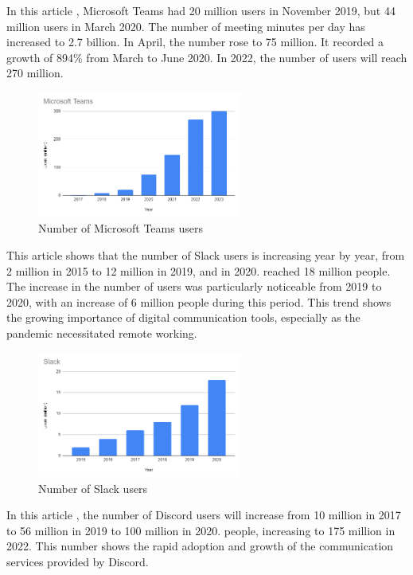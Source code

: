 \documentclass[12pt]{article}
\begin{document}
In this article \cite{teams_status},
Microsoft
Teams had 20 million users in November 2019, but 44 million users in March
2020. The number of meeting minutes per day has increased to 2.7 billion. In
April, the number rose to 75 million. It recorded a growth of
894\% from March to June 2020. In 2022, the number of users will reach 270
million.

\begin{figure}[H]
    \centering
    \includegraphics[width=0.6\textwidth]{teams.png}
    \caption{Number of Microsoft Teams users}
    \label{fig:my_label}
\end{figure}

This article \cite{slack_status} shows that
the number of Slack users is increasing year by year, from 2 million in 2015 to
12 million in 2019, and in 2020. reached 18 million people. The increase in the
number of users was particularly noticeable from 2019 to 2020, with an increase
of 6 million people during this period. This trend shows the growing importance
of digital communication tools, especially as the pandemic necessitated remote
working.

\begin{figure}[H]
    \centering
    \includegraphics[width=0.6\textwidth]{slack.png}
    \caption{Number of Slack users}
    \label{fig:my_label}
\end{figure}

In this article \cite{discord_status}, the
number of Discord users will increase from 10 million in 2017 to 56 million in
2019 to 100 million in 2020. people, increasing to 175 million in 2022. This
number shows the rapid adoption and growth of the communication services
provided by Discord.
\end{document}
